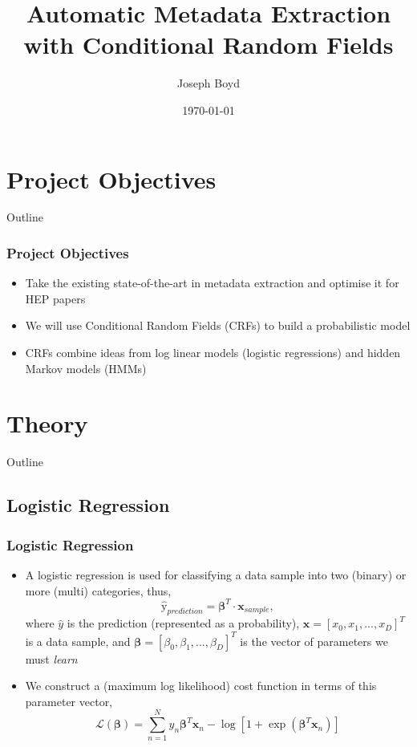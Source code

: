 \documentclass{beamer}
\title[Automatic Metadata Extraction]{Automatic Metadata Extraction with Conditional Random Fields} %
\author{Joseph Boyd} %
\institute[EPFL] %
{
\'Ecole Polytechnique F\'ed\'erale de Lausanne \\ %
\medskip
\textit{joseph.boyd@epfl.ch} %
}
\date{\today} %
\begin{document}
\begin{frame}
\titlepage %
\end{frame}


\section{Project Objectives}
\begin{frame}[noframenumbering]{Outline}
\tableofcontents[currentsection]
\end{frame}


\begin{frame}
\frametitle{Project Objectives}
\begin{itemize}
\item Take the existing state-of-the-art in metadata extraction and optimise it for HEP papers
\item We will use Conditional Random Fields (CRFs) to build a probabilistic model
\item CRFs combine ideas from log linear models (logistic regressions) and hidden Markov models (HMMs)
\end{itemize}
\end{frame}


\section{Theory}
\begin{frame}[noframenumbering]{Outline}
\tableofcontents[currentsection]
\end{frame}


\subsection{Logistic Regression}
\begin{frame}
\frametitle{Logistic Regression}
\begin{itemize}
\item A logistic regression is used for classifying a data sample into two (binary) or more (multi) categories, thus,
$$\hat{\text{y}}_{prediction} = \boldsymbol\beta^{T} \cdot \boldsymbol{x}_{sample},$$
where $\hat{y}$ is the prediction (represented as a probability), $\boldsymbol{x} = [x_0, x_1, ..., x_D]^T$ is a data sample, and $\boldsymbol\beta = [\beta_0, \beta_1, ..., \beta_D]^T$ is the vector of parameters we must \emph{learn}
\item We construct a (maximum log likelihood) cost function in terms of this parameter vector,
$$\mathcal{L}(\boldsymbol\beta) = \sum_{n=1}^N y_n\boldsymbol\beta^T\boldsymbol{x}_n - \log[1 + \exp(\boldsymbol\beta^T\boldsymbol{x}_n)]$$
\end{itemize}
\end{frame}
\end{document}
